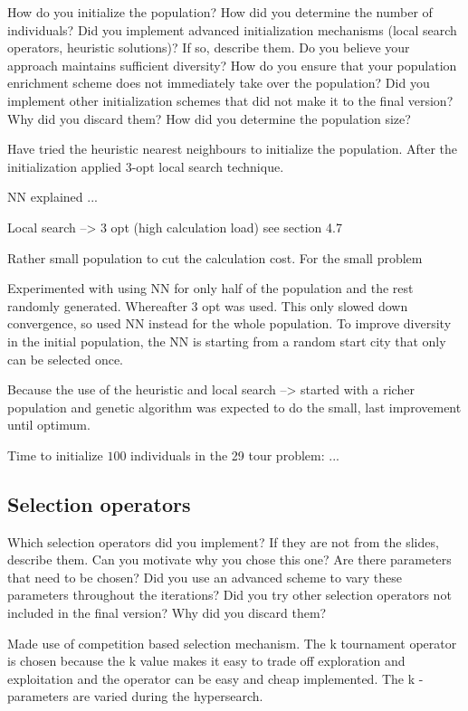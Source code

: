 \documentclass[a4paper,10pt]{article}
\newcommand{\ReplaceMe}[1]{{\color{blue}#1}}
\begin{document}
\ReplaceMe{How do you initialize the population? How did you determine the number of individuals? Did you implement advanced initialization mechanisms (local search operators, heuristic solutions)? If so, describe them. Do you believe your approach maintains sufficient diversity? How do you ensure that your population enrichment scheme does not immediately take over the population? Did you implement other initialization schemes that did not make it to the final version? Why did you discard them? How did you determine the population size?}

Have tried the heuristic nearest neighbours to initialize the population. After the initialization applied 3-opt local search technique. 


NN explained ...

Local search --> 3 opt (high calculation load) see section 4.7

Rather small population to cut the calculation cost. For the small problem

Experimented with using NN for only half of the population and the rest randomly generated. Whereafter 3 opt was used. This only slowed down convergence, so used NN instead for the whole population. To improve diversity in the initial population, the NN is starting from a random start city that only can be selected once. 


Because the use of the heuristic and local search --> started with a richer population and genetic algorithm was expected to do the small, last improvement until optimum. 

Time to initialize $100$ individuals in the 29 tour problem: ...


\subsection{Selection operators}

\ReplaceMe{Which selection operators did you implement? If they are not from the slides, describe them. Can you motivate why you chose this one? Are there parameters that need to be chosen? Did you use an advanced scheme to vary these parameters throughout the iterations? Did you try other selection operators not included in the final version? Why did you discard them?}

Made use of competition based selection mechanism. The k tournament operator is chosen because the k value makes it easy to trade off exploration and exploitation and the operator can be easy and cheap implemented. The k -parameters are varied during the hypersearch. 
\end{document}
